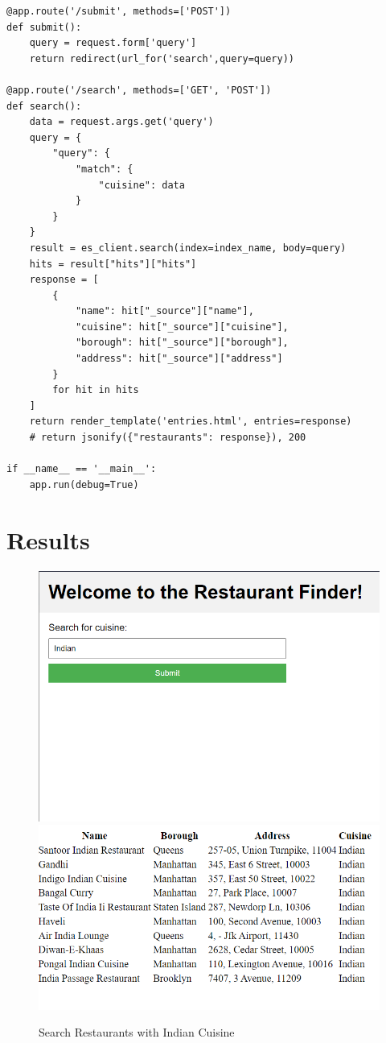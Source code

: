 \documentclass[12pt]{article}
\begin{document}
\begin{verbatim}
@app.route('/submit', methods=['POST'])
def submit():
    query = request.form['query']
    return redirect(url_for('search',query=query))

@app.route('/search', methods=['GET', 'POST'])
def search():
    data = request.args.get('query')
    query = {
        "query": {
            "match": {
                "cuisine": data
            }
        }
    }
    result = es_client.search(index=index_name, body=query)
    hits = result["hits"]["hits"]
    response = [
        {
            "name": hit["_source"]["name"],
            "cuisine": hit["_source"]["cuisine"],
            "borough": hit["_source"]["borough"],
            "address": hit["_source"]["address"]
        }
        for hit in hits
    ]   
    return render_template('entries.html', entries=response) 
    # return jsonify({"restaurants": response}), 200

if __name__ == '__main__':
    app.run(debug=True)
\end{verbatim}
\pagebreak
\section{Results}
\begin{figure}[h!]
    \centering
    \includegraphics[scale = 0.4]{images/IndianQ.png}
    \includegraphics[scale = 0.4]{images/IndianList.png}
    \caption{Search Restaurants with Indian Cuisine}
\end{figure}
\end{document}
